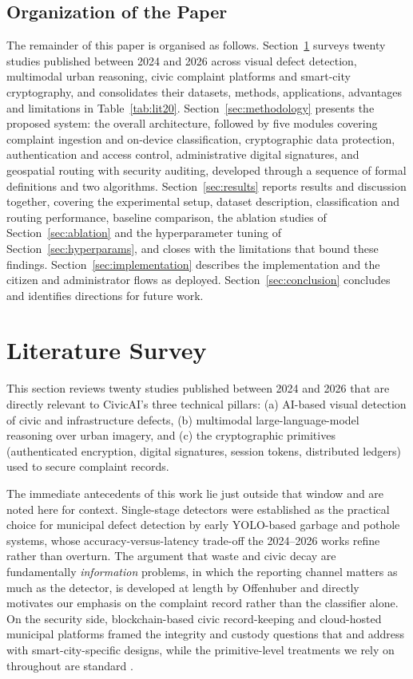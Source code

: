 \documentclass[conference]{IEEEtran}
\begin{document}
\subsection{Organization of the Paper}
The remainder of this paper is organised as follows. Section~\ref{sec:litreview} surveys twenty studies published between 2024 and 2026 across visual defect detection, multimodal urban reasoning, civic complaint platforms and smart-city cryptography, and consolidates their datasets, methods, applications, advantages and limitations in Table~\ref{tab:lit20}. Section~\ref{sec:methodology} presents the proposed system: the overall architecture, followed by five modules covering complaint ingestion and on-device classification, cryptographic data protection, authentication and access control, administrative digital signatures, and geospatial routing with security auditing, developed through a sequence of formal definitions and two algorithms. Section~\ref{sec:results} reports results and discussion together, covering the experimental setup, dataset description, classification and routing performance, baseline comparison, the ablation studies of Section~\ref{sec:ablation} and the hyperparameter tuning of Section~\ref{sec:hyperparams}, and closes with the limitations that bound these findings. Section~\ref{sec:implementation} describes the implementation and the citizen and administrator flows as deployed. Section~\ref{sec:conclusion} concludes and identifies directions for future work.

\section{Literature Survey}
\label{sec:litreview}

This section reviews twenty studies published between 2024 and 2026 that are directly relevant to CivicAI's three technical pillars: (a) AI-based visual detection of civic and infrastructure defects, (b) multimodal large-language-model reasoning over urban imagery, and (c) the cryptographic primitives (authenticated encryption, digital signatures, session tokens, distributed ledgers) used to secure complaint records.

The immediate antecedents of this work lie just outside that window and are noted here for context. Single-stage detectors were established as the practical choice for municipal defect detection by early YOLO-based garbage \cite{majumdar2020yolov4} and pothole \cite{ahmed2021pothole} systems, whose accuracy-versus-latency trade-off the 2024--2026 works refine rather than overturn. The argument that waste and civic decay are fundamentally \emph{information} problems, in which the reporting channel matters as much as the detector, is developed at length by Offenhuber \cite{offenhuber2017waste} and directly motivates our emphasis on the complaint record rather than the classifier alone. On the security side, blockchain-based civic record-keeping \cite{goyal2023blockchain} and cloud-hosted municipal platforms \cite{islam2022cloud} framed the integrity and custody questions that \cite{l16scchain} and \cite{l17decentralizedtrust} address with smart-city-specific designs, while the primitive-level treatments we rely on throughout are standard \cite{stallings2017crypto}.
\end{document}

